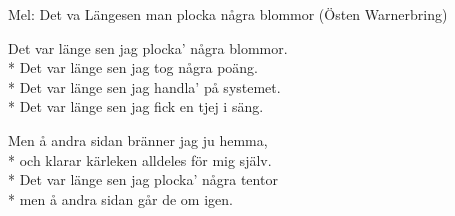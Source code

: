 \begin{SongText}
    \begin{SongInfo}
        Mel: Det va Längesen man plocka några blommor (Östen Warnerbring)
    \end{SongInfo}
    \begin{SongVerse}
        Det var länge sen jag plocka’ några blommor.\\*%
        Det var länge sen jag tog några poäng.\\*%
        Det var länge sen jag handla’ på systemet.\\*%
        Det var länge sen jag fick en tjej i säng.
    \end{SongVerse}
    \begin{SongVerse}
        Men å andra sidan bränner jag ju hemma,\\*%
        och klarar kärleken alldeles för mig själv.\\*%
        Det var länge sen jag plocka’ några tentor\\*%
        men å andra sidan går de om igen.
    \end{SongVerse}
\end{SongText}
